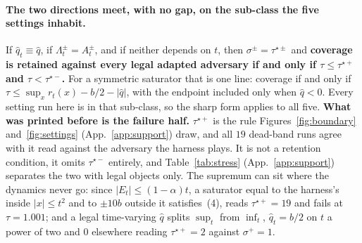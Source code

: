 \paragraph{The two directions meet, with no gap, on the sub-class the five settings inhabit.} If
$\hat{q}_t \equiv \hat{q}$, if $\Lambda^{\pm}_t = A^{\pm}_t$, and if neither depends on $t$, then
$\sigma^{\pm} = \tau^{\star\pm}$ and \textbf{coverage is retained against every legal adapted
adversary if and only if $\tau \le \tau^{\star+}$ and $\tau < \tau^{\star-}$.} For a symmetric
saturator that is one line: coverage if and only if $\tau \le \sup_x r_t(x) - b/2 - |\hat{q}|$,
with the endpoint included only when $\hat{q} < 0$. Every setting run here is in that sub-class,
so the sharp form applies to all five. \textbf{What was printed before is the failure half.}
$\tau^{\star+}$ is the rule Figures~\ref{fig:boundary} and~\ref{fig:settings} (App.~\ref{app:support})
draw, and all $19$
dead-band runs agree with it read against the adversary the harness plays. It is not a retention
condition, it omits $\tau^{\star-}$ entirely, and Table~\ref{tab:stress}
(App.~\ref{app:support}) separates the two with legal objects only. The supremum can
sit where the dynamics never go: since $|E_t| \le (1-\alpha)t$, a saturator equal to the harness's
inside $|x| \le t^2$ and to $\pm 10b$ outside it satisfies~(4), reads $\tau^{\star+} = 19$ and
fails at $\tau = 1.001$; and a legal time-varying $\hat{q}$ splits $\sup_t$ from $\inf_t$,
$\hat{q}_t = b/2$ on $t$ a power of two and $0$ elsewhere reading $\tau^{\star+} = 2$ against
$\sigma^{+} = 1$.

